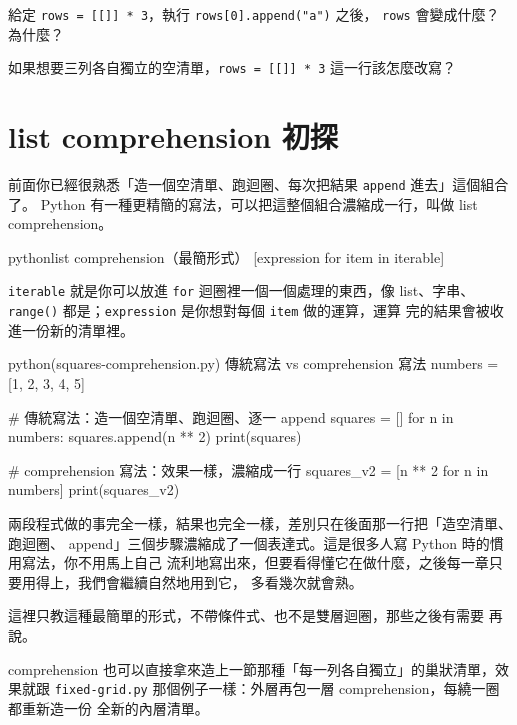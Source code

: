 \begin{drills}[label=drills:nested-alias]
\item 給定 \texttt{rows = [[]] * 3}，執行 \texttt{rows[0].append("a")} 之後，
\texttt{rows} 會變成什麼？為什麼？
\item 如果想要三列各自獨立的空清單，\texttt{rows = [[]] * 3} 這一行該怎麼改寫？
\end{drills}

\section{list comprehension 初探}
\label{sec:list-comprehension}

前面你已經很熟悉「造一個空清單、跑迴圈、每次把結果 \texttt{append} 進去」這個組合了。
Python 有一種更精簡的寫法，可以把這整個組合濃縮成一行，叫做 list comprehension。

\begin{code}{python}{list comprehension（最簡形式）}
[expression for item in iterable]
\end{code}

\texttt{iterable} 就是你可以放進 \texttt{for} 迴圈裡一個一個處理的東西，像 list、字串、
\texttt{range()} 都是；\texttt{expression} 是你想對每個 \texttt{item} 做的運算，運算
完的結果會被收進一份新的清單裡。

\begin{example}{python}{(squares-comprehension.py) 傳統寫法 vs comprehension 寫法}
numbers = [1, 2, 3, 4, 5]

# 傳統寫法：造一個空清單、跑迴圈、逐一 append
squares = []
for n in numbers:
    squares.append(n ** 2)
print(squares)

# comprehension 寫法：效果一樣，濃縮成一行
squares_v2 = [n ** 2 for n in numbers]
print(squares_v2)
\end{example}

\iosample{}{[1, 4, 9, 16, 25] \\{} [1, 4, 9, 16, 25] \\}

兩段程式做的事完全一樣，結果也完全一樣，差別只在後面那一行把「造空清單、跑迴圈、
append」三個步驟濃縮成了一個表達式。這是很多人寫 Python 時的慣用寫法，你不用馬上自己
流利地寫出來，但要看得懂它在做什麼，之後每一章只要用得上，我們會繼續自然地用到它，
多看幾次就會熟。

這裡只教這種最簡單的形式，不帶條件式、也不是雙層迴圈，那些之後有需要
再說。

comprehension 也可以直接拿來造上一節那種「每一列各自獨立」的巢狀清單，效果就跟
\texttt{fixed-grid.py} 那個例子一樣：外層再包一層 comprehension，每繞一圈都重新造一份
全新的內層清單。

